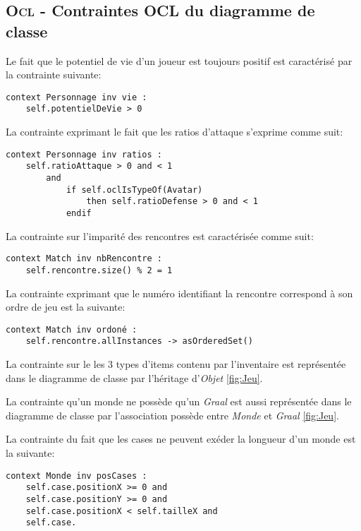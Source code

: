 
\subsection{\textsc{Ocl} - Contraintes OCL du diagramme de classe}
\label{sec:question-4}


Le fait que le potentiel de vie d'un joueur est toujours positif est caractérisé par la contrainte suivante:

\begin{lstlisting}[caption=Contrainte sur lpotentiel de vie,captionpos=b,label={lst:vie},language=OCL]
context Personnage inv vie :
	self.potentielDeVie > 0
\end{lstlisting}

La contrainte exprimant le fait que les ratios d'attaque s'exprime comme suit:

\begin{lstlisting}[caption=Contrainte sur les ratios,captionpos=b,label={lst:ratios},language=OCL]
context Personnage inv ratios :
	self.ratioAttaque > 0 and < 1
		and
			if self.oclIsTypeOf(Avatar)
				then self.ratioDefense > 0 and < 1
			endif
\end{lstlisting}

La contrainte sur l'imparité des rencontres est caractérisée comme suit:

\begin{lstlisting}[caption=Contrainte sur l'imparité des rencontres,captionpos=b,label={lst:impair},language=OCL]
context Match inv nbRencontre :
	self.rencontre.size() % 2 = 1
\end{lstlisting}

La contrainte exprimant que le numéro identifiant la rencontre correspond à son ordre de jeu est la suivante:

\begin{lstlisting}[caption=Contrainte sur l'ordre des rencontres,captionpos=b,label={lst:ordreRencontres},language=OCL]
context Match inv ordoné :
	self.rencontre.allInstances -> asOrderedSet()
\end{lstlisting}

La contrainte sur le les 3 types d'items contenu par l'inventaire est représentée dans le diagramme de classe par l'héritage d'\emph{Objet} \ref{fig:Jeu}.

La contrainte qu'un monde ne possède qu'un \emph{Graal} est aussi représentée dans le diagramme de classe par l'association possède entre \emph{Monde} et \emph{Graal} \ref{fig:Jeu}.

La contrainte du fait que les cases ne peuvent exéder la longueur d'un monde est la suivante:

\begin{lstlisting}
context Monde inv posCases :
	self.case.positionX >= 0 and
	self.case.positionY >= 0 and
	self.case.positionX < self.tailleX and
	self.case.
\end{lstlisting}